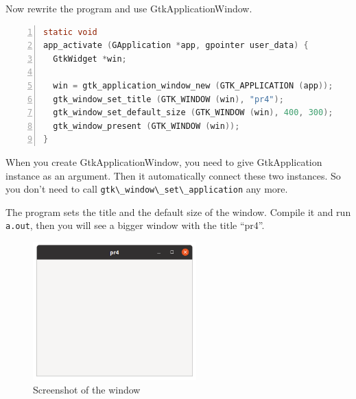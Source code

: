 Now rewrite the program and use GtkApplicationWindow.

\begin{lstlisting}[language=C, numbers=left]
static void
app_activate (GApplication *app, gpointer user_data) {
  GtkWidget *win;

  win = gtk_application_window_new (GTK_APPLICATION (app));
  gtk_window_set_title (GTK_WINDOW (win), "pr4");
  gtk_window_set_default_size (GTK_WINDOW (win), 400, 300);
  gtk_window_present (GTK_WINDOW (win));
}
\end{lstlisting}

When you create GtkApplicationWindow, you need to give GtkApplication
instance as an argument. Then it automatically connect these two
instances. So you don't need to call
\passthrough{\lstinline!gtk\_window\_set\_application!} any more.

The program sets the title and the default size of the window. Compile
it and run \passthrough{\lstinline!a.out!}, then you will see a bigger
window with the title ``pr4''.

\begin{figure}
\centering
\includegraphics[width=6.3cm,height=5.325cm]{../image/screenshot_pr4.png}
\caption{Screenshot of the window}
\end{figure}
